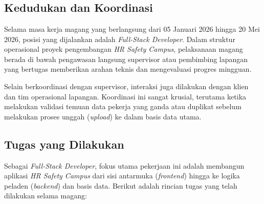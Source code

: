 \chapter{\babTiga}

\section{Kedudukan dan Koordinasi}
Selama masa kerja magang yang berlangsung dari 05 Januari 2026 hingga 20 Mei 2026, posisi yang dijalankan adalah \textit{Full-Stack Developer}. Dalam struktur operasional proyek pengembangan \textit{HR Safety Campus}, pelaksanaan magang berada di bawah pengawasan langsung supervisor atau pembimbing lapangan yang bertugas memberikan arahan teknis dan mengevaluasi progres mingguan.

Selain berkoordinasi dengan supervisor, interaksi juga dilakukan dengan klien dan tim operasional lapangan. Koordinasi ini sangat krusial, terutama ketika melakukan validasi temuan data pekerja yang ganda atau duplikat sebelum melakukan proses unggah (\textit{upload}) ke dalam basis data utama.

\section{Tugas yang Dilakukan}
\label{sec:tugas}
Sebagai \textit{Full-Stack Developer}, fokus utama pekerjaan ini adalah membangun aplikasi \textit{HR Safety Campus} dari sisi antarmuka (\textit{frontend}) hingga ke logika peladen (\textit{backend}) dan basis data. Berikut adalah rincian tugas yang telah dilakukan selama magang:

